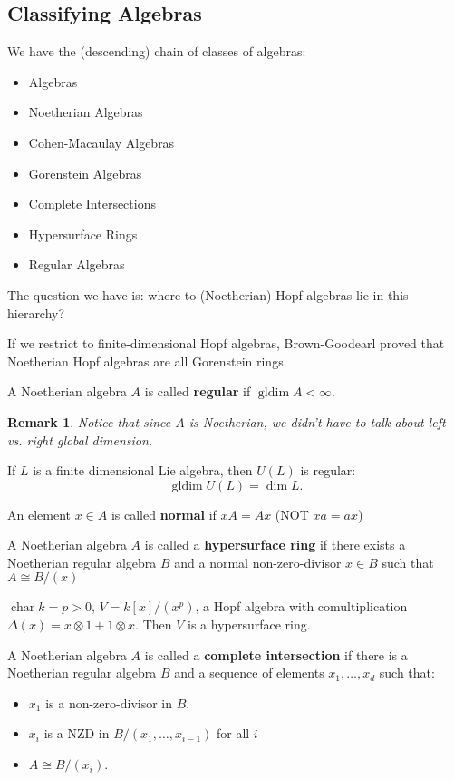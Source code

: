 \documentclass[12pt]{article}
\theoremstyle{break}
\theoremstyle{nonumberbreak}
\theoremstyle{changebreak}
\theoremstyle{break}
\theoremstyle{nonumberbreak}
\theoremstyle{nonumberplain}
\theoremstyle{change}
\newtheorem{rmk}[thm]{Remark}
\DeclareMathOperator{\gldim}{gldim}
\DeclareMathOperator{\ch}{char}
\begin{document}
\subsection{Classifying Algebras}
We have the (descending) chain of classes of algebras:
\begin{itemize}
	\item Algebras
	\item Noetherian Algebras
	\item Cohen-Macaulay Algebras
	\item Gorenstein Algebras
	\item Complete Intersections
	\item Hypersurface Rings
	\item Regular Algebras
\end{itemize}
The question we have is: where to (Noetherian) Hopf algebras lie in this hierarchy?

If we restrict to finite-dimensional Hopf algebras, Brown-Goodearl proved that Noetherian Hopf algebras
are all Gorenstein rings.

\begin{defn}
	A Noetherian algebra $A$ is called \textbf{regular} if $\gldim A<\infty$.
\end{defn}
\begin{rmk}
	Notice that since $A$ is Noetherian, we didn't have to talk about left vs. right global dimension.
\end{rmk}
\begin{ex}
	If $L$ is a finite dimensional Lie algebra, then $U(L)$ is regular:
	\[\gldim U(L)=\dim L.\]
\end{ex}
\begin{defn}
	An element $x\in A$ is called \textbf{normal} if $xA=Ax$ (NOT $xa=ax$)
\end{defn}
\begin{defn}
	A Noetherian algebra $A$ is called a \textbf{hypersurface ring} if there exists a Noetherian 
	regular algebra $B$ and a normal non-zero-divisor $x\in B$ such that $A\cong B/(x)$
\end{defn}
\begin{ex}
	$\ch k=p>0$, $V=k[x]/(x^p)$, a Hopf algebra with comultiplication $\Delta(x)=x\otimes 1+1\otimes x$.
	Then $V$ is a hypersurface ring.
\end{ex}
\begin{defn}
	A Noetherian algebra $A$ is called a \textbf{complete intersection} if there is a Noetherian regular algebra
	$B$ and a sequence of elements $x_1,\dots,x_d$ such that:
	\begin{itemize}
		\item $x_1$ is a non-zero-divisor in $B$.
		\item $x_i$ is a NZD in $B/(x_1,\dots,x_{i-1})$ for all $i$
		\item $A\cong B/(x_i)$.
	\end{itemize}
\end{defn}
\end{document}
